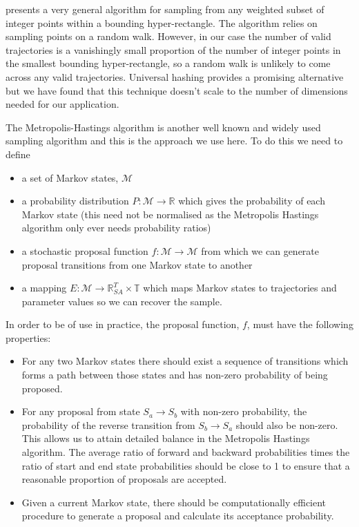 \documentclass{article}
\begin{document}
\citet{baumert2009discrete} presents a very general algorithm for sampling from any weighted subset of integer points within a bounding hyper-rectangle. The algorithm relies on sampling points on a random walk. However, in our case the number of valid trajectories is a vanishingly small proportion of the number of integer points in the smallest bounding hyper-rectangle, so a random walk is unlikely to come across any valid trajectories. Universal hashing \citep{meel2016constrained} provides a promising alternative but we have found that this technique doesn't scale to the number of dimensions needed for our application.

The Metropolis-Hastings algorithm is another well known and widely used sampling algorithm and this is the approach we use here. To do this we need to define
\begin{itemize}
\item a set of Markov states, $\mathcal{M}$

\item a probability distribution $P: \mathcal{M} \to \mathbb{R}$ which gives the probability of each Markov state (this need not be normalised as the Metropolis Hastings algorithm only ever needs probability ratios)

\item a stochastic proposal function $f:\mathcal{M} \to \mathcal{M}$ from which we can generate proposal transitions from one Markov state to another

\item a mapping $E:\mathcal{M} \to \mathbb{R}^T_{SA} \times \mathbb{T}$ which maps Markov states to trajectories and parameter values so we can recover the sample.
\end{itemize}

In order to be of use in practice, the proposal function, $f$, must have the following properties:
\begin{itemize}
	\item For any two Markov states there should exist a sequence of transitions which forms a path between those states and has non-zero probability of being proposed.

	\item For any proposal from state $S_a \to S_b$ with non-zero probability, the probability of the reverse transition from $S_b \to S_a$ should also be non-zero. This allows us to attain detailed balance in the Metropolis Hastings algorithm. The average ratio of forward and backward probabilities times the ratio of start and end state probabilities should be close to 1 to ensure that a reasonable proportion of proposals are accepted.

	\item Given a current Markov state, there should be computationally efficient procedure to generate a proposal and calculate its acceptance probability. 
\end{itemize}
\end{document}
